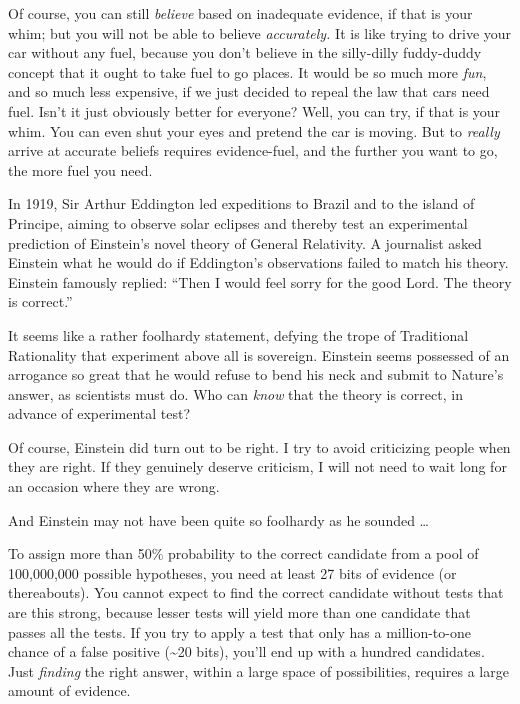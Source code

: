 {
 Of course, you can still \textit{believe} based on inadequate
evidence, if that is your whim; but you will not be able to believe
\textit{accurately.} It is like trying to drive your car without any
fuel, because you don't believe in the silly-dilly
fuddy-duddy concept that it ought to take fuel to go places. It would
be so much more \textit{fun}, and so much less expensive, if we just
decided to repeal the law that cars need fuel. Isn't it
just obviously better for everyone? Well, you can try, if that is your
whim. You can even shut your eyes and pretend the car is moving. But to
\textit{really} arrive at accurate beliefs requires evidence-fuel, and
the further you want to go, the more fuel you need.}

\myendsectiontext

\label{einsteins_arrogance}

{
 In 1919, Sir Arthur Eddington led expeditions to Brazil and to the
island of Principe, aiming to observe solar eclipses and thereby test
an experimental prediction of Einstein's novel theory
of General Relativity. A journalist asked Einstein what he would do if
Eddington's observations failed to match his theory.
Einstein famously replied: ``Then I would feel sorry
for the good Lord. The theory is correct.'' }

{
 It seems like a rather foolhardy statement, defying the trope of
Traditional Rationality that experiment above all is sovereign.
Einstein seems possessed of an arrogance so great that he would refuse
to bend his neck and submit to Nature's answer, as
scientists must do. Who can \textit{know} that the theory is correct,
in advance of experimental test?}

{
 Of course, Einstein did turn out to be right. I try to avoid
criticizing people when they are right. If they genuinely deserve
criticism, I will not need to wait long for an occasion where they are
wrong.}

{
 And Einstein may not have been quite so foolhardy as he sounded
\ldots}

{
 To assign more than 50\% probability to the correct candidate from
a pool of 100,000,000 possible hypotheses, you need at least 27 bits of
evidence (or thereabouts). You cannot expect to find the correct
candidate without tests that are this strong, because lesser tests will
yield more than one candidate that passes all the tests. If you try to
apply a test that only has a million-to-one chance of a false positive
(\~{}20 bits), you'll end up with a hundred candidates.
Just \textit{finding} the right answer, within a large space of
possibilities, requires a large amount of evidence.}

